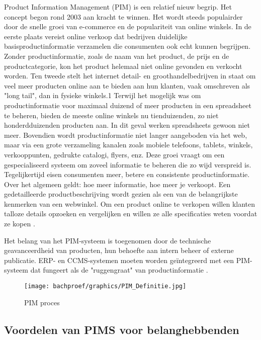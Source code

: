 Product Information Management (PIM) is een relatief nieuw begrip. Het concept begon rond 2003 aan kracht te winnen. Het wordt steeds populairder door de snelle groei van e-commerce en de populariteit van online winkels. In de eerste plaats vereist online verkoop dat bedrijven duidelijke basisproductinformatie verzamelen die consumenten ook echt kunnen begrijpen. Zonder productinformatie, zoals de naam van het product, de prijs en de productcategorie, kon het product helemaal niet online gevonden en verkocht worden. Ten tweede stelt het internet detail- en groothandelbedrijven in staat om veel meer producten online aan te bieden aan hun klanten, vaak omschreven als "long tail", dan in fysieke winkels.1 Terwijl het mogelijk was om productinformatie voor maximaal duizend of meer producten in een spreadsheet te beheren, bieden de meeste online winkels nu tienduizenden, zo niet honderdduizenden producten aan. In dit geval werken spreadsheets gewoon niet meer. Bovendien wordt productinformatie niet langer aangeboden via het web, maar via een grote verzameling kanalen zoals mobiele telefoons, tablets, winkels, verkooppunten, gedrukte catalogi, flyers, enz. Deze groei vraagt om een gespecialiseerd systeem om zoveel informatie te beheren die zo wijd verspreid is. Tegelijkertijd eisen consumenten meer, betere en consistente productinformatie. Over het algemeen geldt: hoe meer informatie, hoe meer je verkoopt. Een gedetailleerde productbeschrijving wordt gezien als een van de belangrijkste kenmerken van een webwinkel. Om een product online te verkopen willen klanten talloze details opzoeken en vergelijken en willen ze alle specificaties weten voordat ze kopen \autocite{Abraham2014}.
\par
Het belang van het PIM-systeem is toegenomen door de technische geavanceerdheid van producten, hun behoefte aan intern beheer of externe publicatie. ERP- en CCMS-systemen moeten worden geïntegreerd met een PIM-systeem dat fungeert als de "ruggengraat" van productinformatie \autocite{Matos2022}.

\begin{figure}[!htb]
  \centering
  \texttt{[image: bachproef/graphics/PIM\_Definitie.jpg]}
  \caption{PIM proces}
  \label{fig:PIM proces}
  \autocite{Derpunkt2021}
\end{figure}

\subsection{Voordelen van PIMS voor belanghebbenden}
\label{Voordelen van PIMS voor belanghebbenden}

